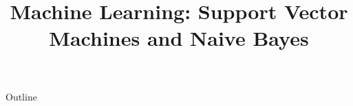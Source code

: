 \documentclass[xcolor=dvipsnames,compress,t,pdf,9pt]{beamer}
\title[\insertframenumber /\inserttotalframenumber]{Machine Learning: Support Vector Machines and Naive Bayes}
\begin{document}
	\begin{frame}
	\titlepage
	\end{frame}

	\begin{frame}{Outline}
	    \tableofcontents
	\end{frame}

	
	
	
\end{document}
